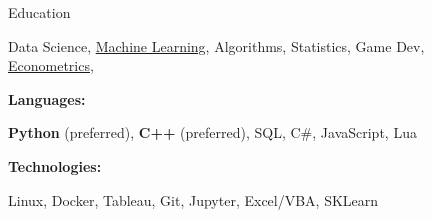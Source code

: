 \documentclass{resume/resume}
\begin{document}
\begin{rSection}{Education}
\begin{adjustwidth}{3.5em}{0pt}
    Data Science,
    \href{https://github.com/Spelkington/mlearning}{Machine Learning},
    Algorithms,
    Statistics,
    Game Dev,
    \href{https://github.com/Spelkington/econometrics}{Econometrics},
    
\end{adjustwidth}


%
%   
%
%
%
\vspace{-0.4em}
{\bf Languages:}
\vspace{-1.83em}
\begin{adjustwidth}{6em}{0pt}
    {\bf Python} (preferred), 
    {\bf C++} (preferred),
    SQL,
    C\#,
    JavaScript,
    Lua
\end{adjustwidth}

%
%
%
\vspace{-3pt}
{\bf Technologies:}
\vspace{-1.83em}
\begin{adjustwidth}{7em}{0pt}
    Linux,
    Docker,
    Tableau,
    Git,
    Jupyter,
    Excel/VBA,
    SKLearn

\end{adjustwidth}

\end{rSection}
\end{document}
